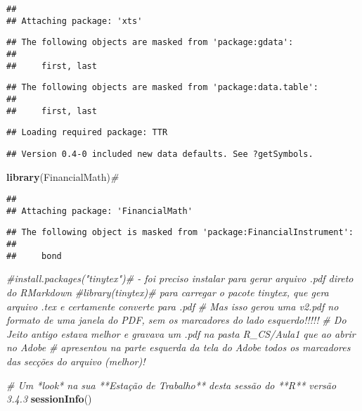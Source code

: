 \documentclass[]{article}
\newenvironment{Shaded}{\begin{snugshade}}{\end{snugshade}}
\newcommand{\KeywordTok}[1]{\textcolor[rgb]{0.13,0.29,0.53}{\textbf{#1}}}
\newcommand{\CommentTok}[1]{\textcolor[rgb]{0.56,0.35,0.01}{\textit{#1}}}
\newcommand{\NormalTok}[1]{#1}
\begin{document}
\begin{verbatim}
## 
## Attaching package: 'xts'
\end{verbatim}

\begin{verbatim}
## The following objects are masked from 'package:gdata':
## 
##     first, last
\end{verbatim}

\begin{verbatim}
## The following objects are masked from 'package:data.table':
## 
##     first, last
\end{verbatim}

\begin{verbatim}
## Loading required package: TTR
\end{verbatim}

\begin{verbatim}
## Version 0.4-0 included new data defaults. See ?getSymbols.
\end{verbatim}

\begin{Shaded}
\begin{Highlighting}[]
\KeywordTok{library}\NormalTok{(FinancialMath)}\CommentTok{#}
\end{Highlighting}
\end{Shaded}

\begin{verbatim}
## 
## Attaching package: 'FinancialMath'
\end{verbatim}

\begin{verbatim}
## The following object is masked from 'package:FinancialInstrument':
## 
##     bond
\end{verbatim}

\begin{Shaded}
\begin{Highlighting}[]
\CommentTok{#install.packages("tinytex")#   - foi preciso instalar para gerar arquivo .pdf direto do RMarkdown}
\CommentTok{#library(tinytex)# para carregar o pacote tinytex, que gera arquivo .tex e certamente converte para .pdf}
\CommentTok{#                  Mas isso gerou uma v2.pdf no formato de uma janela do PDF, sem os marcadores do lado esquerdo!!!!!}
\CommentTok{#                  Do Jeito antigo estava melhor e gravava um .pdf na pasta R_CS/Aula1 que ao abrir no Adobe}
\CommentTok{#                  apresentou na parte esquerda da tela do Adobe todos os marcadores das secções do arquivo (melhor)!}

\CommentTok{# Um *look* na sua **Estação de Trabalho** desta sessão do **R** versão 3.4.3}
\KeywordTok{sessionInfo}\NormalTok{()}
\end{Highlighting}
\end{Shaded}
\end{document}
